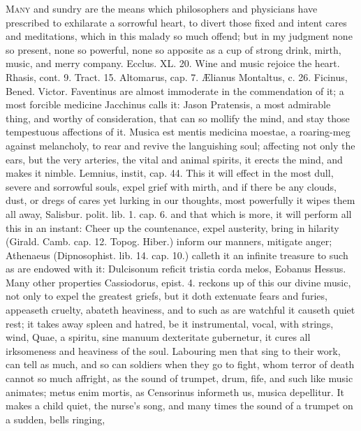 {\lettrine{M}{any} and sundry are the means which philosophers and physicians have
prescribed to exhilarate a sorrowful heart, to divert those fixed and
intent cares and meditations, which in this malady so much offend; but
in my judgment none so present, none so powerful, none so apposite as a
cup of strong drink, mirth, music, and merry company. Ecclus. XL. 20.
Wine and music rejoice the heart. Rhasis, cont. 9. Tract. 15.
Altomarus, cap. 7. \AE{}lianus Montaltus, c. 26. Ficinus, Bened. Victor.
Faventinus are almost immoderate in the commendation of it; a most
forcible medicine Jacchinus calls it: Jason Pratensis, a most
admirable thing, and worthy of consideration, that can so mollify the
mind, and stay those tempestuous affections of it. Musica est mentis
medicina moestae, a roaring-meg against melancholy, to rear and revive
the languishing soul; affecting not only the ears, but the very
arteries, the vital and animal spirits, it erects the mind, and makes
it nimble. Lemnius, instit, cap. 44. This it will effect in the most
dull, severe and sorrowful souls, expel grief with mirth, and if
there be any clouds, dust, or dregs of cares yet lurking in our
thoughts, most powerfully it wipes them all away, Salisbur. polit. lib.
1. cap. 6. and that which is more, it will perform all this in an
instant: Cheer up the countenance, expel austerity, bring in
hilarity (Girald. Camb. cap. 12. Topog. Hiber.) inform our manners,
mitigate anger; Athenaeus (Dipnosophist. lib. 14. cap. 10.) calleth it
an infinite treasure to such as are endowed with it: Dulcisonum reficit
tristia corda melos, Eobanus Hessus. Many other properties
Cassiodorus, epist. 4. reckons up of this our divine music, not
only to expel the greatest griefs, but it doth extenuate fears and
furies, appeaseth cruelty, abateth heaviness, and to such as are
watchful it causeth quiet rest; it takes away spleen and hatred, be it
instrumental, vocal, with strings, wind, Quae, a spiritu, sine
manuum dexteritate gubernetur, \etc{} it cures all irksomeness and
heaviness of the soul. Labouring men that sing to their work, can
tell as much, and so can soldiers when they go to fight, whom terror of
death cannot so much affright, as the sound of trumpet, drum, fife, and
such like music animates; metus enim mortis, as Censorinus
informeth us, musica depellitur. It makes a child quiet, the nurse's
song, and many times the sound of a trumpet on a sudden, bells ringing,
}
